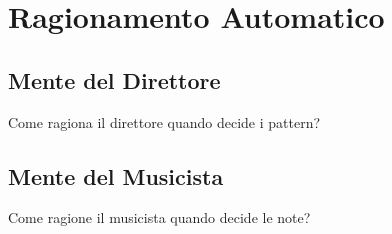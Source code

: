 \section{Ragionamento Automatico}
\label{thinking}
\subsection{Mente del Direttore}
Come ragiona il direttore quando decide i pattern?
\subsection{Mente del Musicista}
Come ragione il musicista quando decide le note?
